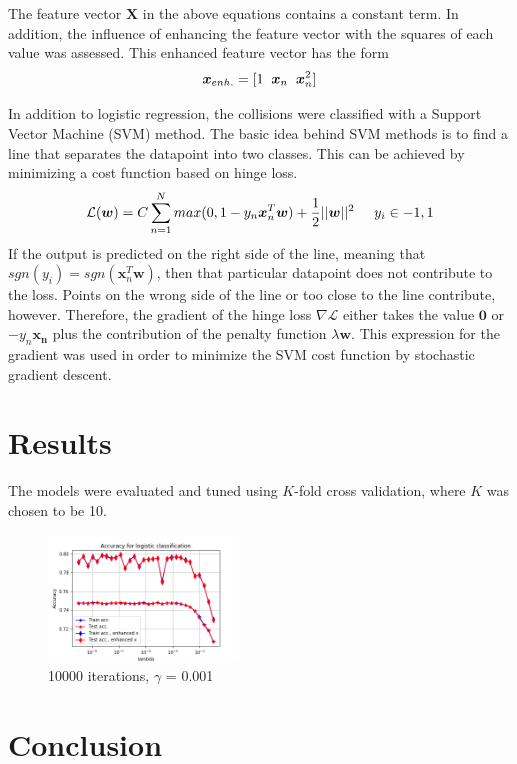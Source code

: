 \documentclass[10pt,conference,compsocconf]{IEEEtran}
\begin{document}
The feature vector $\boldsymbol{X}$ in the above equations contains a constant term. In addition, the influence of enhancing the feature vector with the squares of each value was assessed. This enhanced feature vector has the form
\begin{equation}
\boldsymbol{x}_{enh.} = [1 \hspace{2mm} \boldsymbol{x}_n \hspace{2mm} \boldsymbol{x}_n^2]
\end{equation}
\par
In addition to logistic regression, the collisions were classified with a Support Vector Machine (SVM) method. The basic idea behind SVM methods is to find a line that separates the datapoint into two classes. This can be achieved by minimizing a cost function based on hinge loss.
\begin{equation}
\mathcal{L}(\boldsymbol{w}) = C \sum_{n=1}^N max(0,1-y_n \boldsymbol{x}_n^T\boldsymbol{w}) + \frac{1}{2}||\boldsymbol{w}||^2 \hspace{5mm} y_i \in {-1,1}
\end{equation}  
If the output is predicted on the right side of the line, meaning that $sgn(y_i) = sgn(\boldsymbol{x}_n^T\boldsymbol{w})$, then that particular datapoint does not contribute to the loss. Points on the wrong side of the line or too close to the line contribute, however. Therefore, the gradient of the hinge loss $\nabla \mathcal{L}$ either takes the value $\boldsymbol{0}$ or $-y_n\boldsymbol{x_n}$ plus the contribution of the penalty function $\lambda \boldsymbol{w}$. This expression for the gradient was used in order to minimize the SVM cost function by stochastic gradient descent.  

\section*{Results}
The models were evaluated and tuned using $K$-fold cross validation, where $K$ was chosen to be 10.
\begin{figure}[H]
	\centering
	\includegraphics[width=0.45\textwidth]{accuracy_logistic.png}
	\caption{10000 iterations, $\gamma$ = 0.001}
\end{figure}


\section*{Conclusion}



\end{document}
